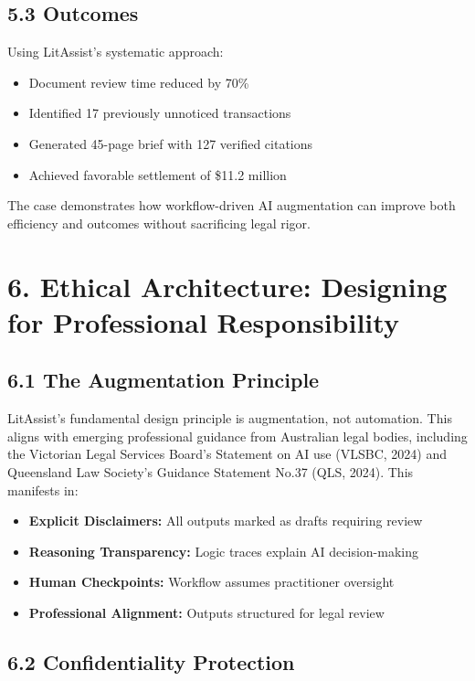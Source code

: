 \documentclass[12pt,a4paper]{article}
\begin{document}
\subsection*{5.3 Outcomes}

Using LitAssist's systematic approach:
\begin{itemize}
\item Document review time reduced by 70\%
\item Identified 17 previously unnoticed transactions
\item Generated 45-page brief with 127 verified citations
\item Achieved favorable settlement of \$11.2 million
\end{itemize}

The case demonstrates how workflow-driven AI augmentation can improve both efficiency and outcomes without sacrificing legal rigor.

\section*{6. Ethical Architecture: Designing for Professional Responsibility}

\subsection*{6.1 The Augmentation Principle}

LitAssist's fundamental design principle is augmentation, not automation. This aligns with emerging professional guidance from Australian legal bodies, including the Victorian Legal Services Board's Statement on AI use (VLSBC, 2024) and Queensland Law Society's Guidance Statement No.37 (QLS, 2024). This manifests in:

\begin{itemize}
\item \textbf{Explicit Disclaimers:} All outputs marked as drafts requiring review
\item \textbf{Reasoning Transparency:} Logic traces explain AI decision-making
\item \textbf{Human Checkpoints:} Workflow assumes practitioner oversight
\item \textbf{Professional Alignment:} Outputs structured for legal review
\end{itemize}

\subsection*{6.2 Confidentiality Protection}
\end{document}
